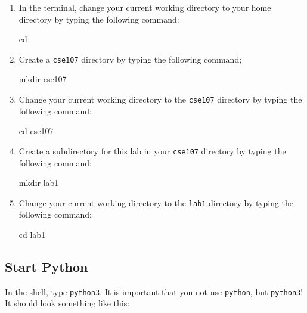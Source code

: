\documentclass[11pt]{cselabheader}
\begin{document}
\begin{enumerate}
\item In the terminal, change your current working directory to your home
  directory by typing the following command:

\begin{bashcode}
cd
\end{bashcode}

\item Create a \texttt{cse107} directory by typing the following command;

\begin{bashcode}
mkdir cse107
\end{bashcode}

\item Change your current working directory to the \texttt{cse107} directory by
  typing the following command:

\begin{bashcode}
cd cse107
\end{bashcode}

\item Create a subdirectory for this lab in your \texttt{cse107} directory by
  typing the following command:

\begin{bashcode}
mkdir lab1
\end{bashcode}

\item Change your current working directory to the \texttt{lab1} directory by
  typing the following command:

\begin{bashcode}
cd lab1
\end{bashcode}

\end{enumerate}

\subsection{Start Python}

In the shell, type \texttt{python3}. It is important that you not use
\texttt{python}, but \texttt{python3}! It should look something like this:

\end{document}

